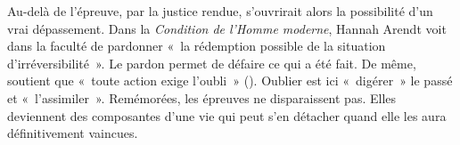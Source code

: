 {Au-delà de l'épreuve, par la justice rendue, s'ouvrirait alors la possibilité d'un vrai
dépassement. Dans la \textit{Condition de l'Homme moderne}, Hannah Arendt voit dans la faculté de
pardonner «~la rédemption possible de la situation d'irréversibilité~». Le pardon permet de défaire
ce qui a été fait. De même,  soutient que «~toute action exige l'oubli~» (). Oublier est ici «~digérer~» le passé et «~l'assimiler~». Remémorées, les
épreuves ne disparaissent pas. Elles deviennent des composantes d'une vie qui peut s'en détacher
quand elle les aura définitivement vaincues.}

\vfill{~}\newpage

